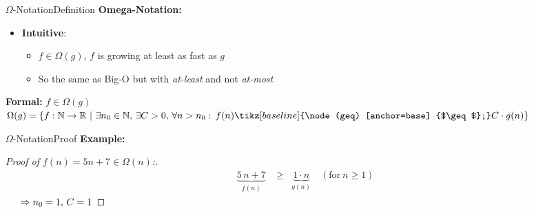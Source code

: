 \begin{frame}{$\Omega$-Notation}{Definition}
  \textbf{Omega-Notation:}
  \begin{itemize}
    \item
      \textbf{Intuitive}:
      \begin{itemize}
        \item
          $f \in \Omega(g)$, $f$ is growing at least as fast as $g$
        \item
          So the same as Big-O but with \textit{at-least} and not
          \textit{at-most}
      \end{itemize}
  \end{itemize}
  \begin{block}{\textbf{Formal:} $f \in \Omega(g)$}
    \begin{math}
      \Omega(g) = \lbrace f: \mathbb{N} \to \mathbb{R} ~ | ~
        \exists n_0 \in \mathbb{N}, \, \exists C > 0, \,  \forall n > n_0:\,
        f(n) \tikz[baseline] {\node (geq) [anchor=base] {$\geq$};}
        C \cdot g(n)\rbrace
    \end{math}
  \end{block}
  \begin{center}
  \end{center}
\end{frame}


\begin{frame}{$\Omega$-Notation}{Proof}
  \label{slide:prooftwo}
  \textbf{Example:}\\
  \begin{proof}[Proof of $f(n) = 5n + 7 \in \Omega(n)$:]
    \begin{eqnarray*}
      &\underbrace{5 \, n + 7}_{f(n)} &\geq \;\; \underbrace{1 \cdot n}_{g(n)}
      \hspace{1em} (\text{for} ~ n \geq 1)
    \end{eqnarray*}
    $\hspace{1.5em} \Rightarrow n_0 = 1, \, C = 1$ \qedhere
  \end{proof}
\end{frame}

